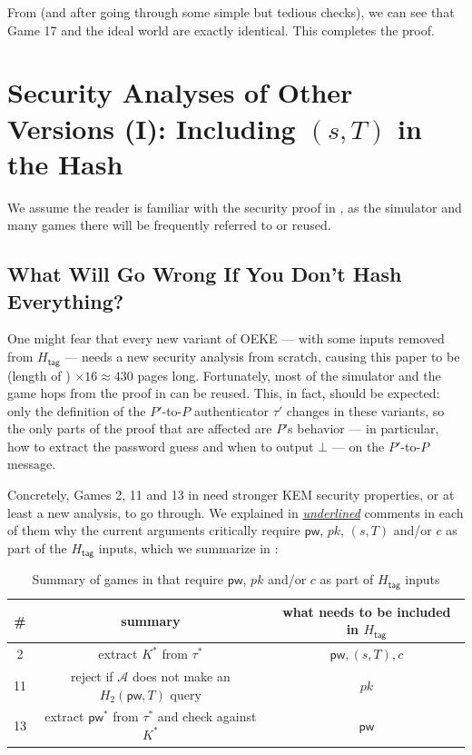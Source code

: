\documentclass{article}
\theoremstyle{plain}
\theoremstyle{definition}
\theoremstyle{remark}
\newcommand{\adv}{\mathcal{A}}
\newcommand{\Htag}{H_\mathsf{tag}}
\newcommand{\pw}{\mathsf{pw}}
\begin{document}
From  (and after going through some simple but tedious checks), we can see that Game 17 and the ideal world are exactly identical. This completes the proof.

\section{Security Analyses of Other Versions (I): Including $(s,T)$ in the Hash}
\label{sec:other-variants-1}
We assume the reader is familiar with the security proof in , as the simulator and many games there will be frequently referred to or reused.

\subsection{What Will Go Wrong If You Don't Hash Everything?}
One might fear that every new variant of OEKE --- with some inputs removed from $\Htag$ --- needs a new security analysis from scratch, causing this paper to be (length of ) $\times 16 \approx 430$ pages long. Fortunately, most of the simulator and the game hops from the proof in  can be reused. This, in fact, should be expected: only the definition of the $P'$-to-$P$ authenticator $\tau'$ changes in these variants, so the only parts of the proof that are affected are $P$'s behavior --- in particular, how to extract the password guess and when to output $\bot$ --- on the $P'$-to-$P$ message.

Concretely, Games 2, 11 and 13 in  need stronger KEM security properties, or at least a new analysis, to go through. We explained in \emph{{\color{red}\ul{underlined}}} comments in each of them why the current arguments critically require $\pw$, $pk$, $(s,T)$ and/or $c$ as part of the $\Htag$ inputs, which we summarize in :
\begin{table}[H]\centering
\begin{tabular}{ |c|c|c| }
\hline
 \# & summary & \makecell{what needs to be \\ included in $\Htag$} \\
\hline
 2 & extract $K^*$ from $\tau^*$ & $\pw,(s,T),c$ \\
\hline
 11 & \makecell{reject if $\adv$ does not make \\ an $H_2(\pw,T)$ query} & $pk$ \\
\hline
 13 & \makecell{extract $\pw^*$ from $\tau^*$ \\ and check against $K^*$} & $\pw$ \\
\hline
\end{tabular}
\caption{Summary of games in  that require $\pw$, $pk$ and/or $c$ as part of $\Htag$ inputs}
\label{tab:game-summary}
\end{table}
\end{document}
